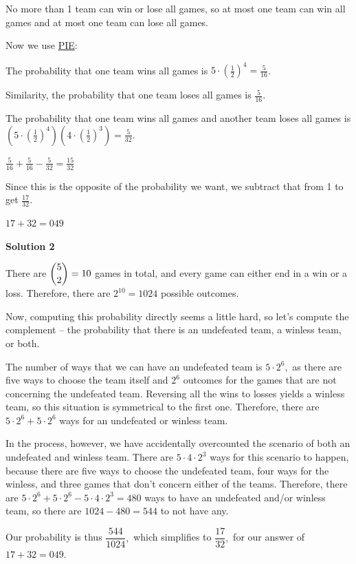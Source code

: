 \begin{enumerate}
 No more than 1 team can win or lose all games, so at most one team can win all games and at most one team can lose all games.

 Now we use \href{https://artofproblemsolving.com/wiki/index.php?title=PIE}{PIE}:

 The probability that one team wins all games is $5\cdot \left(\frac{1}{2}\right)^4=\frac{5}{16}$.

 Similarity, the probability that one team loses all games is $\frac{5}{16}$.

 The probability that one team wins all games and another team loses all games is $\left(5\cdot \left(\frac{1}{2}\right)^4\right)\left(4\cdot \left(\frac{1}{2}\right)^3\right)=\frac{5}{32}$.

 $\frac{5}{16}+\frac{5}{16}-\frac{5}{32}=\frac{15}{32}$

 Since this is the opposite of the probability we want, we subtract that from 1 to get $\frac{17}{32}$.

 $17+32=\boxed{049}$




\textbf{Solution 2}

There are $\dbinom{5}{2} = 10$ games in total, and every game can either end in a win or a loss. Therefore, there are $2^{10} = 1024$ possible outcomes.

 Now, computing this probability directly seems a little hard, so let's compute the complement -- the probability that there is an undefeated team, a winless team, or both.

 The number of ways that we can have an undefeated team is $5 \cdot 2^6,$ as there are five ways to choose the team itself and $2^6$ outcomes for the games that are not concerning the undefeated team. Reversing all the wins to losses yields a winless team, so this situation is symmetrical to the first one. Therefore, there are $5 \cdot 2^6 + 5 \cdot 2^6$ ways for an undefeated or winless team.

 In the process, however, we have accidentally overcounted the scenario of both an undefeated and winless team. There are $5 \cdot 4 \cdot 2^3$ ways for this scenario to happen, because there are five ways to choose the undefeated team, four ways for the winless, and three games that don't concern either of the teams. Therefore, there are $5 \cdot 2^6 + 5 \cdot 2^6 - 5 \cdot 4 \cdot 2^3 = 480$ ways to have an undefeated and/or winless team, so there are $1024 - 480 = 544$ to not have any.

 Our probability is thus $\dfrac{544}{1024},$ which simplifies to $\dfrac{17}{32},$ for our answer of $17 + 32 = \boxed{049}.$


\end{enumerate}

